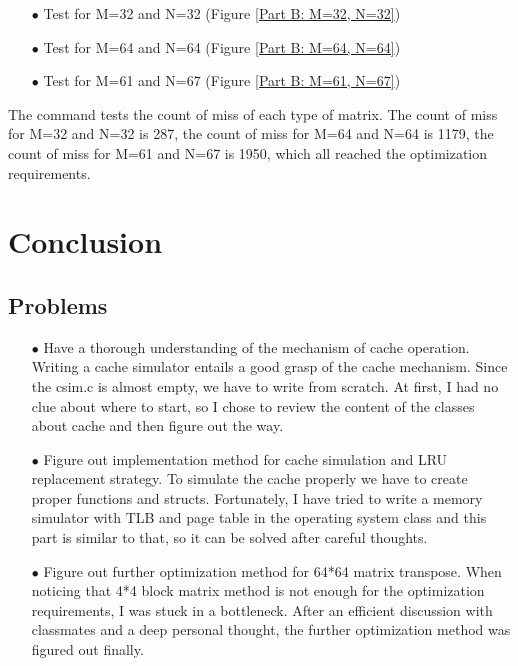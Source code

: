 \documentclass{article}
\begin{document}
\begin{itemize}
\item[$\bullet$]Test for M=32 and N=32 (Figure \ref{Part B: M=32, N=32})
\item[$\bullet$]Test for M=64 and N=64 (Figure \ref{Part B: M=64, N=64})
\item[$\bullet$]Test for M=61 and N=67 (Figure \ref{Part B: M=61, N=67})
\end{itemize}
The command tests the count of miss of each type of matrix. The count of miss for M=32 and N=32 is 287,  the count of miss for M=64 and N=64 is 1179, the count of miss for M=61 and N=67 is 1950, which all  reached the optimization requirements.
\section{Conclusion}

\subsection{Problems}

\begin{itemize}
\item[$\bullet$]Have a thorough understanding of the mechanism of cache operation. Writing a cache simulator entails a good grasp of the cache mechanism. Since the csim.c is almost empty, we have to write from scratch. At first, I had no clue about where to start, so I chose to review the content of the classes about cache and then figure out the way.
\item[$\bullet$]Figure out implementation method for cache simulation and LRU replacement strategy. To simulate the cache properly we have to create proper functions and structs. Fortunately, I have tried to write a memory simulator with TLB and page table in the operating system class and this part is similar to that, so it can be solved after careful thoughts.
\item[$\bullet$]Figure out further optimization method for 64*64 matrix transpose. When noticing that 4*4 block matrix method is not enough for the optimization requirements, I was stuck in a bottleneck. After an efficient discussion with classmates and a deep personal thought, the further optimization method was figured out finally.
\end{itemize}
\end{document}
